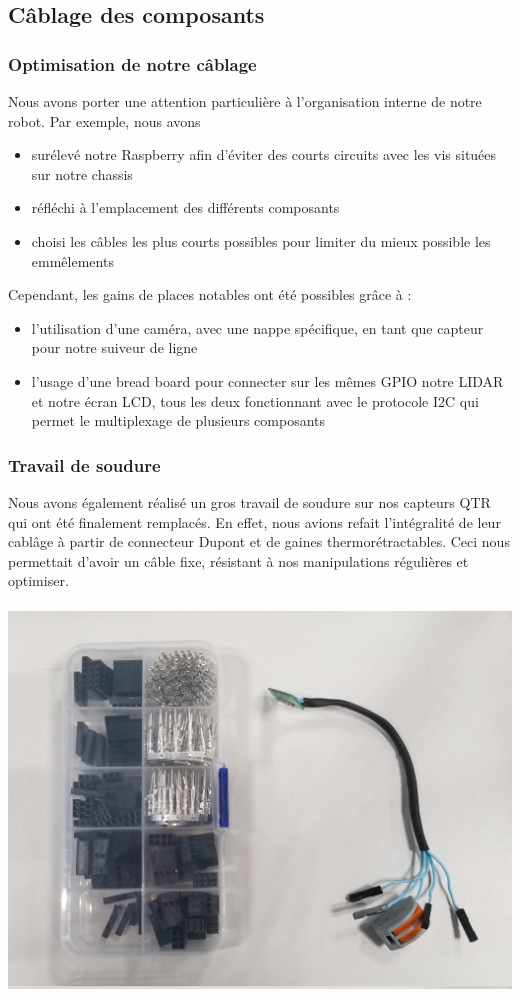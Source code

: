 \subsection{Câblage des composants}

\subsubsection*{Optimisation de notre câblage}
Nous avons porter une attention particulière à l'organisation interne de notre robot. Par exemple, nous avons 
\begin{itemize}
    \item surélevé notre Raspberry afin d'éviter des courts circuits avec les vis situées sur notre chassis
    \item réfléchi à l'emplacement des différents composants
    \item choisi les câbles les plus courts possibles pour limiter du mieux possible les emmêlements
\end{itemize}
Cependant, les gains de places notables ont été possibles grâce à :
\begin{itemize}
    \item l'utilisation d'une caméra, avec une nappe spécifique, en tant que capteur pour notre suiveur de ligne
    \item l'usage d'une bread board pour connecter sur les mêmes GPIO notre LIDAR et notre écran LCD, tous les deux fonctionnant avec le protocole I2C qui permet le multiplexage de plusieurs composants
\end{itemize}

\subsubsection*{Travail de soudure}
Nous avons également réalisé un gros travail de soudure sur nos capteurs QTR qui ont été finalement remplacés. En effet, nous avions refait l'intégralité de leur cablâge à partir de connecteur Dupont et de gaines thermorétractables. Ceci nous permettait d'avoir un câble fixe, résistant à nos manipulations régulières et optimiser.
\\
\\
\includegraphics[scale=0.09]{../images/capteurQTR.jpg}

